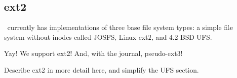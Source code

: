 \subsection{ext2}
\label{sec:using:ext2}

\Kudos\ currently has implementations of three base file system types: a simple
file system without inodes called JOSFS, Linux ext2, and 4.2 BSD UFS.

Yay! We support ext2! And, with the journal, pseudo-ext3!

Describe ext2 in more detail here, and simplify the UFS section.
